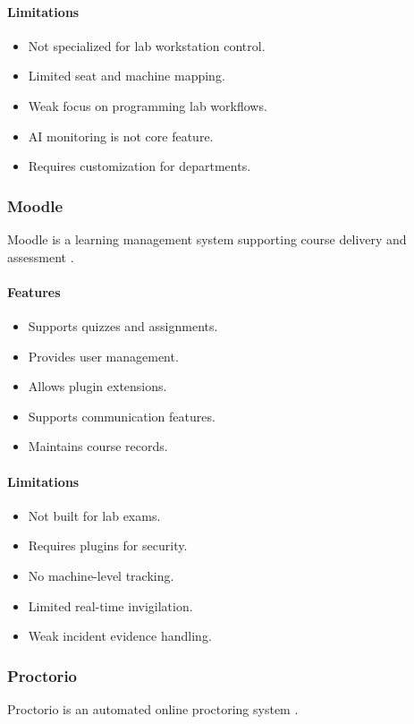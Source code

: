 \paragraph{Limitations}
\begin{itemize}[noitemsep]
\item Not specialized for lab workstation control.
\item Limited seat and machine mapping.
\item Weak focus on programming lab workflows.
\item AI monitoring is not core feature.
\item Requires customization for departments.
\end{itemize}

\subsubsection{Moodle}
Moodle is a learning management system supporting course delivery and assessment \cite{moodle1}.

\paragraph{Features}
\begin{itemize}[noitemsep]
\item Supports quizzes and assignments.
\item Provides user management.
\item Allows plugin extensions.
\item Supports communication features.
\item Maintains course records.
\end{itemize}

\paragraph{Limitations}
\begin{itemize}[noitemsep]
\item Not built for lab exams.
\item Requires plugins for security.
\item No machine-level tracking.
\item Limited real-time invigilation.
\item Weak incident evidence handling.
\end{itemize}

\subsubsection{Proctorio}
Proctorio is an automated online proctoring system \cite{proctorio1}.

